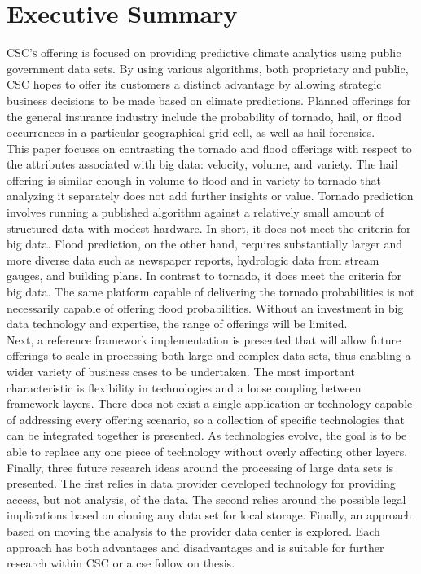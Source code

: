 
\section{Executive Summary}
\textsc{CSC's} \climatedge offering is focused on providing predictive climate analytics using public government data sets. By using various algorithms, both proprietary and public, \textsc{CSC} hopes to offer its customers a distinct advantage by allowing strategic business decisions to be made based on climate predictions. Planned offerings for the general insurance industry include the probability of tornado, hail, or flood occurrences in a particular geographical grid cell, as well as hail forensics. \\

This paper focuses on contrasting the tornado and flood offerings with respect to the attributes associated with big data: velocity, volume, and variety. The hail offering is similar enough in volume to flood and in variety to tornado that analyzing it separately does not add further insights or value. Tornado prediction involves running a published algorithm against a relatively small amount of structured data with modest hardware. In short, it does not meet the criteria for big data. Flood prediction, on the other hand, requires substantially larger and more diverse data such as newspaper reports, hydrologic data from stream gauges, and building plans.  In contrast to tornado, it does meet the criteria for big data. The same platform capable of delivering the tornado probabilities is not necessarily capable of offering flood probabilities. Without an investment in big data technology and expertise, the range of \climatedge offerings will be limited.\\

Next, a reference framework implementation is presented that will allow future \climatedge offerings to scale in processing both large and complex data sets, thus enabling a wider variety of business cases to be undertaken. The most important characteristic is flexibility in technologies and a loose coupling between framework layers. There does not exist a single application or technology capable of addressing every offering scenario, so a collection of specific technologies that can be integrated together is presented. As technologies evolve, the goal is to be able to replace any one piece of technology without overly affecting other layers. \\

Finally, three future research ideas around the processing of large data sets is presented. The first relies in data provider developed technology for providing access, but not analysis, of the data.  The second relies around the possible legal implications based on cloning any data set for local storage. Finally, an approach based on moving the analysis to the provider data center is explored. Each approach has both advantages and disadvantages and is suitable for further research within \textsc{CSC} or a \gls{cse} follow on thesis.